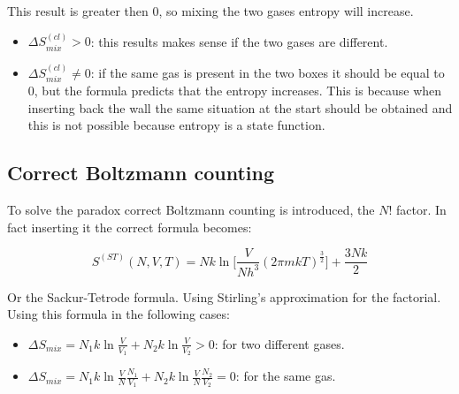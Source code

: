 This result is greater then $0$, so mixing the two gases entropy will increase.

\begin{multicols}{2}
	\begin{itemize}
		\item $\Delta S_{mix}^{(cl)} > 0$: this results makes sense if the two gases are different.
		\item $\Delta S_{mix}^{(cl)} \neq 0$: if the same gas is present in the two boxes it should be equal to $0$, but the formula predicts that the entropy increases.
			This is because when inserting back the wall the same situation at the start should be obtained and this is not possible because entropy is a state function.
	\end{itemize}
\end{multicols}

	\subsection{Correct Boltzmann counting}
	To solve the paradox correct Boltzmann counting is introduced, the $N!$ factor.
	In fact inserting it the correct formula becomes:

	$$S^{(ST)}(N, V, T) = Nk\ln\biggl[\frac{V}{Nh^3}(2\pi mkT)^{\frac{3}{2}}\biggr] + \frac{3Nk}{2}$$

	Or the Sackur-Tetrode formula.
	Using Stirling's approximation for the factorial.
	Using this formula in the following cases:

	\begin{multicols}{2}
		\begin{itemize}
			\item $\Delta S_{mix}= N_1k\ln\frac{V}{V_1}+N_2k\ln\frac{V}{V_2} > 0$: for two different gases.
			\item $\Delta S_{mix} = N_1k\ln\frac{V}{N}\frac{N_1}{V_1} + N_2 k\ln\frac{V}{N}\frac{N_2}{V_2}= 0$: for the same gas.
		\end{itemize}
	\end{multicols}
